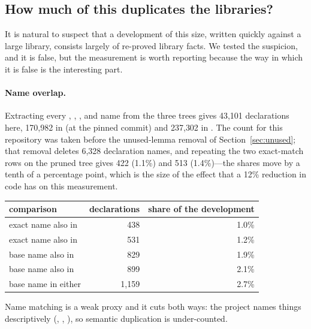 \subsection{How much of this duplicates the libraries?}
\label{sec:dup}

It is natural to suspect that a development of this size, written quickly against a large
library, consists largely of re-proved library facts. We tested the suspicion, and it is
false, but the measurement is worth reporting because the way in which it is false is the
interesting part.

\paragraph{Name overlap.} Extracting every , , ,
 and  name from the three trees gives 43{,}101 declarations
here, 170{,}982 in \Mathlib{} (at the pinned commit) and 237{,}302 in \TauCeti{}. The count
for this repository was taken before the unused-lemma removal of
Section~\ref{sec:unused}; that removal deletes 6{,}328 declaration names, and repeating the
two exact-match rows on the pruned tree gives 422 (1.1\%) and 513 (1.4\%)---the shares move
by a tenth of a percentage point, which is the size of the effect that a 12\% reduction in
code has on this measurement.

\begin{center}\small
\begin{tabular}{@{}lrr@{}}
\toprule
comparison & declarations & share of the development \\
\midrule
exact name also in \Mathlib{} & 438 & 1.0\% \\
exact name also in \TauCeti{} & 531 & 1.2\% \\
base name also in \Mathlib{} & 829 & 1.9\% \\
base name also in \TauCeti{} & 899 & 2.1\% \\
base name in either & 1{,}159 & 2.7\% \\
\bottomrule
\end{tabular}
\end{center}

Name matching is a weak proxy and it cuts both ways: the project names things
descriptively (, , ), so semantic
duplication is under-counted.

